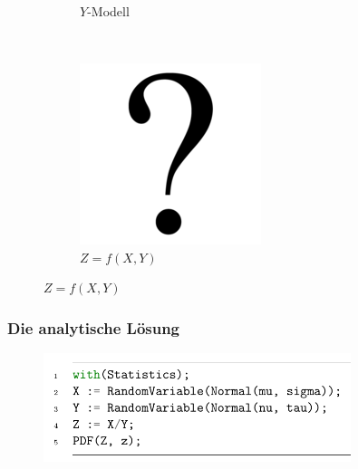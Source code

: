 \documentclass[11pt]{beamer}
\begin{document}
\begin{frame}
\begin{figure}
\begin{subfigure}{0.3\textwidth}
      \caption{$Y$-Modell}
    \end{subfigure}
    \\
    \vspace{1em}
    \begin{subfigure}{0.3\textwidth}
      \centering
      \includegraphics[width=\textwidth]{presentation/question-mark}
      \caption{$Z = f(X, Y)$}
    \end{subfigure}
  \end{figure}
\end{frame}

\begin{frame}[fragile]
  \frametitle{Die analytische Lösung}
  \begin{figure}
    \includegraphics[width=0.8\textwidth]{presentation/maple-code}
  \end{figure}
\end{frame}
\end{document}
